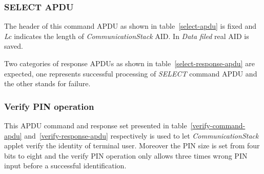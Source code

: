 \subsubsection{SELECT APDU}
The header of this command APDU as shown in table~\ref{select-apdu} is fixed and \emph{Lc} indicates the length of \emph{CommunicationStack} AID. In \emph{Data filed} real AID is saved.
\begin{table}[!htbp]
\caption{SELECT Command APDU}
\label{select-apdu}
\end{table}

Two categories of response APDUs as shown in table~\ref{select-response-apdu} are expected, one represents successful processing of \emph{SELECT} command APDU and the other stands for failure.
\begin{table}[!htbp]
\caption{SELECT Response APDU}
\label{select-response-apdu}
\end{table}

\subsubsection{Verify PIN operation}
This APDU command and response set presented in table~\ref{verify-command-apdu} and~\ref{verify-response-apdu} respectively is used to let \emph{CommunicationStack} applet verify the identity of terminal user. Moreover the PIN size is set from four bits to eight and the verify PIN operation only allows three times wrong PIN input before a successful identification.

\begin{table}[!htb]
\caption{Verify PIN Command }
\label{verify-command-apdu}
\end{table}

